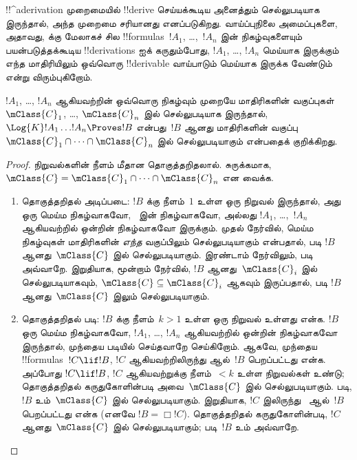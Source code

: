 \documentclass[../../../include/open-logic-section]{subfiles}
\begin{document}


!!^a{derivation} முறைமையில் !!{derive} செய்யக்கூடிய அனைத்தும்
செல்லுபடியாக இருந்தால், அந்த முறைமை சரியானது எனப்படுகிறது. வாய்ப்புநிலை
அமைப்புகளை, அதாவது,  க்கு மேலாகச் சில !!{formula}s~$!A_1$,
\dots,~$!A_n$ இன் நிகழ்வுகளையும் பயன்படுத்தக்கூடிய !!{derivation}s ஐக்
கருதும்போது, $!A_1$, \dots, $!A_n$ மெய்யாக இருக்கும் எந்த மாதிரியிலும்
ஒவ்வொரு !!{derivable} வாய்பாடும் மெய்யாக இருக்க வேண்டும் என்று விரும்புகிறோம்.

\begin{thm}[சரித்தன்மைத் தேற்றம்]
  $!A_1$, \dots, $!A_n$ ஆகியவற்றின் ஒவ்வொரு நிகழ்வும் முறையே
  மாதிரிகளின் வகுப்புகள்~$\mClass{C}_1$, \dots, $\mClass{C}_n$ இல்
  செல்லுபடியாக இருந்தால், $\Log{K}!A_1\dots !A_n
  \Proves !B$ என்பது~$!B$ ஆனது மாதிரிகளின் வகுப்பு
  $\mClass{C}_1 \cap \dots \cap \mClass{C}_n$ இல் செல்லுபடியாகும்
  என்பதைக் குறிக்கிறது.
\end{thm}

\begin{proof}
  நிறுவல்களின் நீளம் மீதான தொகுத்தறிதலால். சுருக்கமாக, $\mClass{C} =
  \mClass{C}_1 \cap \dots \cap \mClass{C}_n$ என வைக்க.
  \begin{enumerate}
  \item தொகுத்தறிதல் அடிப்படை: $!B$ க்கு நீளம்~$1$ உள்ள ஒரு நிறுவல்
    இருந்தால், அது ஒரு மெய்ம நிகழ்வாகவோ,~
    இன் நிகழ்வாகவோ,
    அல்லது $!A_1$, \dots,~$!A_n$ ஆகியவற்றில் ஒன்றின் நிகழ்வாகவோ இருக்கும்.
    முதல் நேர்வில், மெய்ம நிகழ்வுகள் மாதிரிகளின் \emph{எந்த} வகுப்பிலும்
    செல்லுபடியாகும் என்பதால்,  படி
    $!B$ ஆனது~$\mClass{C}$ இல் செல்லுபடியாகும். இரண்டாம் நேர்விலும்,
     படி அவ்வாறே. இறுதியாக,
    மூன்றாம் நேர்வில், $!B$ ஆனது~$\mClass{C}_i$ இல் செல்லுபடியாகவும்,
    $\mClass{C} \subseteq \mClass{C}_i$ ஆகவும் இருப்பதால்,
     படி $!B$ ஆனது~$\mClass{C}$
    இலும் செல்லுபடியாகும்.
  \item தொகுத்தறிதல் படி: $!B$ க்கு நீளம்~$k>1$ உள்ள ஒரு நிறுவல் உள்ளது
    என்க. $!B$ ஒரு மெய்ம நிகழ்வாகவோ, $!A_1$, \dots, $!A_n$ ஆகியவற்றில்
    ஒன்றின் நிகழ்வாகவோ இருந்தால், முந்தைய படியில் செய்தவாறே செய்கிறோம்.
    ஆகவே, முந்தைய !!{formula}s~$!C \lif !B$, $!C$ ஆகியவற்றிலிருந்து
    \MP{} ஆல்~$!B$ பெறப்பட்டது என்க. அப்போது $!C \lif !B$, $!C$
    ஆகியவற்றுக்கு நீளம்~$<k$ உள்ள நிறுவல்கள் உண்டு; தொகுத்தறிதல்
    கருதுகோளின்படி அவை~$\mClass{C}$ இல் செல்லுபடியாகும்.
     படி, $!B$ உம்~$\mClass{C}$ இல்
    செல்லுபடியாகும். இறுதியாக, $!C$ இலிருந்து~\Nec{} ஆல்~$!B$
    பெறப்பட்டது என்க (எனவே $!B = \Box!C$). தொகுத்தறிதல்
    கருதுகோளின்படி, $!C$ ஆனது~$\mClass{C}$ இல் செல்லுபடியாகும்;
     படி~$!B$ உம் அவ்வாறே.
  \end{enumerate}
\end{proof}
\end{document}
